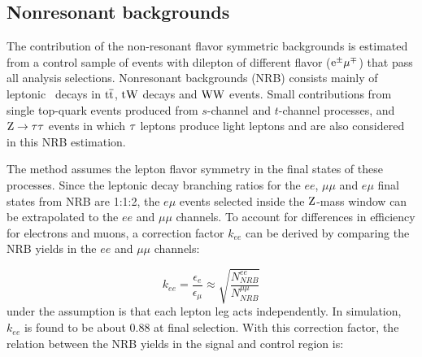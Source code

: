 
\subsection{Nonresonant backgrounds}
The contribution of the non-resonant flavor symmetric backgrounds is  estimated from a control
sample of events with dilepton of different flavor
($\mathrm{e}^{\pm}\mathrm{\mu}^{\mp}$) that pass all analysis selections.
Nonresonant backgrounds (NRB) consists mainly of leptonic \PW\ decays in
${\mathrm{t}\overline{\mathrm{t}}}$, $\mathrm{t}\mathrm{W}$ decays and 
$\mathrm{W}\mathrm{W}$ events. Small contributions from single top-quark events produced from
$s$-channel and $t$-channel processes, and $\mathrm{Z}\rightarrow \mathrm{\tau}\mathrm{\tau}$
events in which $\mathrm{\tau}$ leptons produce light leptons and \ETm are also
considered in this NRB estimation. 

The method assumes the lepton flavor symmetry in the final states of these processes.
Since the leptonic decay branching ratios for the $ee$, $\mu\mu$ and $e\mu$ final states from NRB are 1:1:2,
the $e\mu$ events selected inside the $\mathrm{Z}$-mass window can be extrapolated to the $ee$ and $\mu\mu$ channels.
To account for differences in efficiency for electrons and muons, a correction factor $k_{ee}$ can be derived
by comparing the NRB yields in the $ee$ and $\mu\mu$ channels:

\begin{equation}
k_{ee} = \frac{\epsilon_e}{\epsilon_{\mu}} \approx \sqrt{\frac{N^{ee}_{NRB}}{N^{\mu\mu}_{NRB}}}
\end{equation}
under the assumption is that each lepton leg acts independently.
In simulation, $k_{ee}$ is found to be about $0.88$ at final selection.
With this correction factor, the relation between the NRB yields in the signal and control region is:


